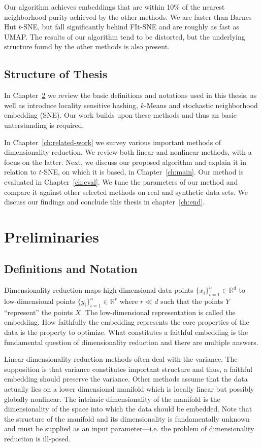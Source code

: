 Our algorithm achieves embeddings that are within 10\% of the nearest
neighborhood purity achieved by the other methods. We are faster than
Barnes-Hut $t$-SNE, but fall significantly behind FIt-SNE and are roughly
as fast as UMAP. The results of our algorithm tend to be distorted, but
the underlying structure found by the other methods is also present.

\section{Structure of Thesis}

In Chapter~\ref{ch:prelim} we review the basic definitions and notations
used in this thesis, as well as introduce locality sensitive hashing, $k$-Means
and stochastic neighborhood embedding (SNE). Our work builds upon these methods
and thus an basic unterstanding is required.

In Chapter~\ref{ch:related-work} we survey various important methods of
dimensionality reduction. We review both linear and nonlinear methods, with a
focus on the latter.  Next, we discuss our proposed algorithm and explain it in
relation to $t$-SNE, on which it is based, in Chapter~\ref{ch:main}. Our
method is evaluated in Chapter~\ref{ch:eval}. We tune the parameters of our
method and compare it against other selected methods on real and synthetic data
sets. We discuss our findings and conclude this thesis in chapter~\ref{ch:end}.

\chapter{Preliminaries}\label{ch:prelim}

\section{Definitions and Notation}

Dimensionality reduction maps high-dimensional data points $\{ x_i \}_{i=1}^{n}
\in \mathbb{R}^d$ to low-dimensional points $\{ y_i \}_{i=1}^{n} \in
\mathbb{R}^r$ where $r \ll d$ such that the points $Y$ ``represent'' the points
$X$. The low-dimensional representation is called the embedding. How faithfully
the embedding represents the core properties of the data is the property to
optimize.  What constitutes a faithful embedding is the fundamental question of
dimensionality reduction and there are multiple answers.

Linear dimensionality reduction methods often deal with the variance. The supposition is
that variance constitutes important structure and thus, a faithful embedding should preserve the
variance. Other methods assume that the data actually lies on a lower dimensional manifold which
is locally linear but possibly globally nonlinear. The intrinsic dimensionality of the manifold
is the dimensionality of the space into which the data should be embedded. Note that the structure
of the manifold and its dimensionality is fundamentally unknown and must be supplied as an
input parameter---i.e. the problem of dimensionality reduction is ill-posed.

